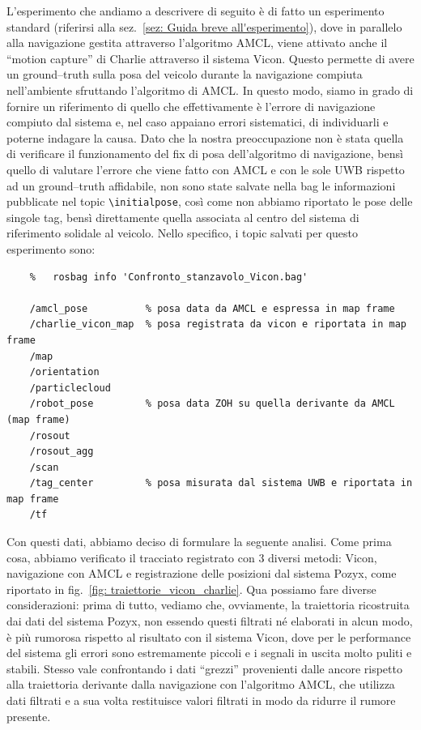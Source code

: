 L'esperimento che andiamo a descrivere di seguito \`e di fatto un esperimento standard (riferirsi alla sez.~\ref{sez: Guida breve all'esperimento}), dove in parallelo alla navigazione gestita attraverso l'algoritmo AMCL, viene attivato anche il ``motion capture'' di Charlie attraverso il sistema Vicon.
Questo permette di avere un ground--truth sulla posa del veicolo durante la navigazione compiuta nell'ambiente sfruttando l'algoritmo di AMCL. 
In questo modo, siamo in grado di fornire un riferimento di quello che effettivamente è l'errore di navigazione compiuto dal sistema e, nel caso appaiano errori sistematici, di individuarli e poterne indagare la causa.
Dato che la nostra preoccupazione non è stata quella di verificare il funzionamento del fix di posa dell'algoritmo di navigazione, bensì quello di valutare l'errore che viene fatto con AMCL e con le sole UWB rispetto ad un ground--truth affidabile, non sono state salvate nella bag le informazioni pubblicate nel topic \verb|\initialpose|, così come non abbiamo riportato le pose delle singole tag, bensì direttamente quella associata al centro del sistema di riferimento solidale al veicolo.
Nello specifico, i topic salvati per questo esperimento sono:
\begin{verbatim}
	%	rosbag info 'Confronto_stanzavolo_Vicon.bag'
	
	/amcl_pose			% posa data da AMCL e espressa in map frame 
	/charlie_vicon_map	% posa registrata da vicon e riportata in map frame
	/map
	/orientation
	/particlecloud
	/robot_pose			% posa data ZOH su quella derivante da AMCL (map frame)
	/rosout
	/rosout_agg
	/scan   
	/tag_center			% posa misurata dal sistema UWB e riportata in map frame
	/tf     
\end{verbatim}

Con questi dati, abbiamo deciso di formulare la seguente analisi.
Come prima cosa, abbiamo verificato il tracciato registrato con 3 diversi metodi: Vicon, navigazione con AMCL e registrazione delle posizioni dal sistema Pozyx, come riportato in fig.~\ref{fig: traiettorie_vicon_charlie}.
Qua possiamo fare diverse considerazioni: prima di tutto, vediamo che, ovviamente, la traiettoria ricostruita dai dati del sistema Pozyx, non essendo questi filtrati né elaborati in alcun modo, è più rumorosa rispetto al risultato con il sistema Vicon, dove per le performance del sistema gli errori sono estremamente piccoli e i segnali in uscita molto puliti e stabili. 
Stesso vale confrontando i dati ``grezzi'' provenienti dalle ancore rispetto alla traiettoria derivante dalla navigazione con l'algoritmo AMCL, che utilizza dati filtrati e a sua volta restituisce valori filtrati in modo da ridurre il rumore presente. 

